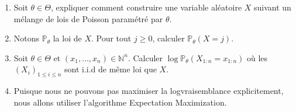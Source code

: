 \documentclass[a4paper,10pt,fleqn]{article}
\newcommand{\1}{\ensuremath{\mathbbm{1}}}
\begin{document}
\begin{enumerate}
\item Soit $\theta\in\Theta$, expliquer comment construire une variable al\'eatoire $X$ suivant un m\'elange de lois de Poisson param\'etr\'e par $\theta$.

%

\item Notons $\mathbb{P}_\theta$ la loi de $X$. Pour tout $j\geq 0$, calculer $\mathbb{P}_\theta(X=j)$.

%
\item Soit $\theta\in\Theta$ et $(x_1,\ldots,x_n)\in\mathbb{N}^n$. Calculer $\log \mathbb{P}_\theta(X_{1:n}=x_{1:n}) $ o\`u les $(X_i)_{1\leq i \leq n}$ sont i.i.d de m\^eme loi que $X$.

%
\item Puisque nous ne pouvons pas maximiser la logvraisemblance explicitement, nous allons utiliser l'algorithme Expectation Maximization.


\end{enumerate}
\end{document}
